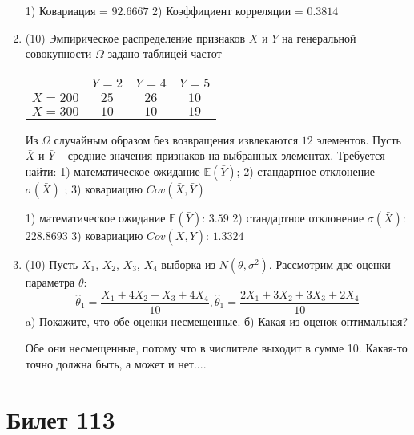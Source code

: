 \documentclass[a4paper,12pt]{article}
\begin{document}
\begin{enumerate}
1) Ковариация = $92.6667$
2) Коэффициент корреляции = $0.3814$


\item


(10) Эмпирическое распределение признаков $X$ и $Y$ на генеральной совокупности $\Omega$ задано таблицей частот  
 
\begin{tabular}{ | c | c | c | c | }
\hline
 & $Y = 2$ & $Y = 4$ & $Y = 5$  \\ \hline
$X = 200$ & $25$ & $26$ & $10$\\ \hline
$X = 300$ & $10$ & $10$ & $19$\\
\hline
\end{tabular}

Из $\Omega$ случайным образом без возвращения извлекаются $12$ элементов. 
Пусть $\bar X$ и $\bar Y$ – средние значения признаков на выбранных элементах. 
Требуется найти: 1) математическое ожидание $\mathbb{E}(\bar Y)$; 2) стандартное отклонение $\sigma(\bar X)$ ; 
3) ковариацию $Cov(\bar X, \bar Y)$




1) математическое ожидание $\mathbb{E}(\bar Y)$: $3.59$ 
2) стандартное отклонение $\sigma(\bar X)$: $228.8693$
3) ковариацию $Cov(\bar X, \bar Y)$: $1.3324$


\item


(10) Пусть $X _{1}$, $X _{2}$, $X _{3}$, $X _{4}$ выборка из $N(\theta, \sigma ^{2})$. Рассмотрим две оценки параметра $\theta$:
\[\hat \theta _{1} = \frac{X _{1} + 4X _{2} + X _{3} + 4X _{4}}{10}, \hat \theta _{1} = \frac{2X _{1} + 3X _{2} + 3X _{3} + 2X _{4}}{10}\]
a) Покажите, что обе оценки несмещенные.
б) Какая из оценок оптимальная?




Обе они несмещенные, потому что в числителе выходит в сумме 10.
Какая-то точно должна быть, а может и нет....



\end{enumerate}

\section{Билет 113}
\end{document}
